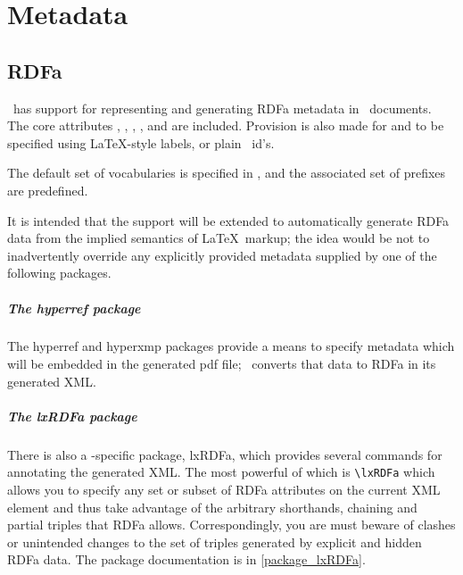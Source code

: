 \documentclass{book}
\begin{document}

\chapter{Metadata}\label{metadata}
\section{RDFa}\label{metadata.RDFa}
\LaTeXML\ has support for representing and generating RDFa metadata in \LaTeXML\ documents.
The core attributes , , , 
,  and  are included.
Provision is also made for  and  to be specified
using \LaTeX-style labels, or plain \XML\ id's.


The default set of vocabularies is specified in
,
and the associated set of prefixes are predefined.

It is intended that the support will be extended to automatically
generate RDFa data from the implied semantics of \LaTeX\ markup;
the idea would be not to inadvertently override any explicitly
provided metadata supplied by one of the following packages.

\paragraph{The hyperref package}
The  hyperref and hyperxmp packages provide a means to specify metadata
which will be embedded in the generated pdf file; \LaTeXML\ converts that
data to RDFa in its generated XML.

\paragraph{The lxRDFa package}
There is also a \LaTeXML-specific package, lxRDFa, which provides
several commands for annotating the generated XML.
The most powerful of which is \verb|\lxRDFa| which allows you to specify
any set or subset of RDFa attributes on the current XML element and thus
take advantage of the arbitrary shorthands, chaining and partial triples
that RDFa allows.  Correspondingly, you are must beware of
clashes or unintended changes to the set of triples generated
by explicit and hidden RDFa data.
The package documentation is in \ref{package_lxRDFa}.
\end{document}
